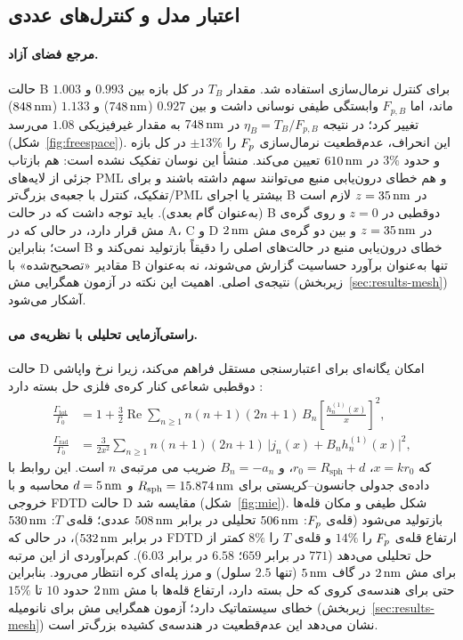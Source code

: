 \subsection{اعتبار مدل و کنترل‌های عددی}
\label{sec:method-validation}

\paragraph{مرجع فضای آزاد.}
حالت B برای کنترل نرمال‌سازی استفاده شد. مقدار $T_B$ در کل بازه بین
$0.993$ و $1.003$ ماند، اما $F_{p,B}$ وابستگی طیفی نوسانی داشت و بین
$0.927$ ($748\,\text{nm}$) و $1.133$ ($848\,\text{nm}$) تغییر کرد؛ در نتیجه
$\eta_B = T_B/F_{p,B}$ در $748\,\text{nm}$ به مقدار غیرفیزیکی $1.08$ می‌رسد
(شکل~\ref{fig:freespace}). این انحراف، عدم‌قطعیت نرمال‌سازی $F_p$ را
$\pm 13\%$ در کل بازه و حدود $3\%$ در $610\,\text{nm}$ تعیین می‌کند. منشأ این نوسان
تفکیک نشده است: هم بازتاب جزئی از لایه‌های PML و هم خطای درون‌یابی منبع می‌توانند
سهم داشته باشند و برای تفکیک، کنترل با جعبه‌ی بزرگ‌تر/PML بیشتر یا اجرای B در $z=35\,\text{nm}$
لازم است (به‌عنوان گام بعدی). باید
توجه داشت که در حالت B دوقطبی در $z=0$ و روی گره‌ی مش قرار دارد، در
حالی که در A، C و D در $z=35\,\text{nm}$ و بین دو گره‌ی مش $2\,\text{nm}$ است؛
بنابراین B خطای درون‌یابی منبع در حالت‌های اصلی را دقیقاً بازتولید
نمی‌کند و مقادیر «تصحیح‌شده» با B تنها به‌عنوان برآورد حساسیت گزارش
می‌شوند، نه به‌عنوان نتیجه‌ی اصلی. اهمیت این نکته در آزمون همگرایی مش
(زیربخش~\ref{sec:results-mesh}) آشکار می‌شود.

\paragraph{راستی‌آزمایی تحلیلی با نظریه‌ی می.}
حالت D امکان یگانه‌ای برای اعتبارسنجی مستقل فراهم می‌کند، زیرا نرخ
واپاشی دوقطبی شعاعی کنار کره‌ی فلزی حل بسته دارد
\cite{ruppin1982decay, kim1988classical, mertens2007plasmon}:
%
\begin{align}
  \frac{\Gamma_{\text{tot}}}{\Gamma_0} &= 1 + \frac{3}{2}\operatorname{Re}
    \sum_{n\ge1} n(n+1)(2n+1)\, B_n \left[\frac{h_n^{(1)}(x)}{x}\right]^2, \label{eq:mie-tot}\\
  \frac{\Gamma_{\text{rad}}}{\Gamma_0} &= \frac{3}{2x^2}
    \sum_{n\ge1} n(n+1)(2n+1)\, \big|j_n(x) + B_n h_n^{(1)}(x)\big|^2, \label{eq:mie-rad}
\end{align}
%
که $x = k r_0$، $r_0 = R_{\text{sph}} + d$، و $B_n = -a_n$ ضریب می
مرتبه‌ی $n$ است. این روابط با داده‌ی جدولی جانسون–کریستی برای
$R_{\text{sph}} = 15.874\,\text{nm}$ و $d=5\,\text{nm}$ محاسبه و با خروجی FDTD حالت D
مقایسه شد (شکل~\ref{fig:mie}). شکل طیفی و مکان قله‌ها بازتولید می‌شود
(قله‌ی $F_p$: $506\,\text{nm}$ تحلیلی در برابر $508\,\text{nm}$ عددی؛ قله‌ی $T$:
$530\,\text{nm}$ در برابر $532\,\text{nm}$)، در حالی که FDTD ارتفاع قله‌ی $F_p$ را
$14\%$ و قله‌ی $T$ را $8\%$ کمتر از حل تحلیلی می‌دهد ($771$ در برابر
$659$؛ $6.58$ در برابر $6.03$). کم‌برآوردی از این مرتبه برای مش $2\,\text{nm}$ در گاف $5\,\text{nm}$ (تنها $2.5$
سلول) و مرز پله‌ای کره انتظار می‌رود. بنابراین حتی برای هندسه‌ی کروی که
حل بسته دارد، ارتفاع قله‌ها با مش $2\,\text{nm}$ حدود $10$ تا $15\%$ خطای
سیستماتیک دارد؛ آزمون همگرایی مش برای نانومیله
(زیربخش~\ref{sec:results-mesh}) نشان می‌دهد این عدم‌قطعیت در هندسه‌ی
کشیده بزرگ‌تر است.

